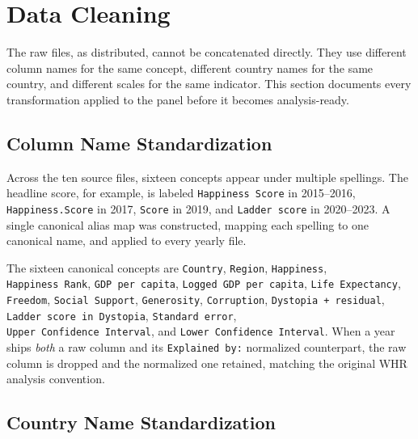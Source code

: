 
\section{Data Cleaning}
\label{sec:data-cleaning}

The raw files, as distributed, cannot be concatenated directly. They use different column names for the same concept, different country names for the same country, and different scales for the same indicator. This section documents every transformation applied to the panel before it becomes analysis-ready.

\subsection{Column Name Standardization}
\label{sec:data-cleaning-columns}

Across the ten source files, sixteen concepts appear under multiple spellings. The headline score, for example, is labeled \texttt{Happiness\ Score} in 2015--2016, \texttt{Happiness.Score} in 2017, \texttt{Score} in 2019, and \texttt{Ladder\ score} in 2020--2023. A single canonical alias map was constructed, mapping each spelling to one canonical name, and applied to every yearly file.

The sixteen canonical concepts are \texttt{Country}, \texttt{Region}, \texttt{Happiness}, \texttt{Happiness\ Rank}, \texttt{GDP\ per\ capita}, \texttt{Logged\ GDP\ per\ capita}, \texttt{Life\ Expectancy}, \texttt{Freedom}, \texttt{Social\ Support}, \texttt{Generosity}, \texttt{Corruption}, \texttt{Dystopia\ +\ residual}, \texttt{Ladder\ score\ in\ Dystopia}, \texttt{Standard\ error},\\ \texttt{Upper\ Confidence\ Interval}, and \texttt{Lower\ Confidence\ Interval}. When a year ships \emph{both} a raw column and its \texttt{Explained\ by:} normalized counterpart, the raw column is dropped and the normalized one retained, matching the original WHR analysis convention.

\subsection{Country Name Standardization}
\label{sec:data-cleaning-countries}

